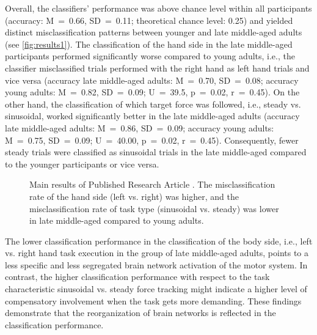 Overall, the classifiers' performance was above chance level within all participants (accuracy: M~=~0.66, SD~=~0.11; theoretical chance level: 0.25) and yielded distinct misclassification patterns between younger and late middle-aged adults (see \autoref{fig:results1}). The classification of the hand side in the late middle-aged participants performed significantly worse compared to young adults, i.e., the classifier misclassified trials performed with the right hand as left hand trials and vice versa (accuracy late middle-aged adults: M~=~0.70, SD~=~0.08; accuracy young adults: M~=~0.82, SD~=~0.09; U~=~39.5, p~=~0.02, r~=~0.45). On the other hand, the classification of which target force was followed, i.e., steady vs. sinusoidal, worked significantly better in the late middle-aged adults (accuracy late middle-aged adults: M~=~0.86, SD~=~0.09; accuracy young adults: M~=~0.75, SD~=~0.09; U~=~40.00, p~=~0.02, r~=~0.45). Consequently, fewer steady trials were classified as sinusoidal trials in the late middle-aged compared to the younger participants or vice versa.

\begin{figure}[h]

\captionsetup{justification=justified}
\caption[Main results of Published Research Article .]{Main results of Published Research Article . The misclassification rate of the hand side (left vs. right)  was higher, and the misclassification rate of task type (sinusoidal vs. steady) was lower in late middle-aged compared to young adults.}
\label{fig:results1}
\end{figure}

\noindent The lower classification performance in the classification of the body side, i.e., left vs. right hand task execution in the group of late middle-aged adults, points to a less specific and less segregated brain network activation of the motor system. In contrast, the higher classification performance with respect to the task characteristic sinusoidal vs. steady force tracking might indicate a higher level of compensatory involvement when the task gets more demanding. These findings demonstrate that the reorganization of brain networks is reflected in the classification performance.

